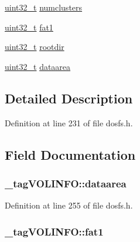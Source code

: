 \begin{DoxyCompactItemize}
\hyperlink{stdint_8h_a435d1572bf3f880d55459d9805097f62}{uint32\-\_\-t} \hyperlink{struct__tag_v_o_l_i_n_f_o_ae43f79217850e7e7d2c58b982ccd70c8}{numclusters}
\item 
\hyperlink{stdint_8h_a435d1572bf3f880d55459d9805097f62}{uint32\-\_\-t} \hyperlink{struct__tag_v_o_l_i_n_f_o_af9ff7c38631aaaa87c0f65832450ca92}{fat1}
\item 
\hyperlink{stdint_8h_a435d1572bf3f880d55459d9805097f62}{uint32\-\_\-t} \hyperlink{struct__tag_v_o_l_i_n_f_o_aa405d5cc36175170ff8b5c771e7f2433}{rootdir}
\item 
\hyperlink{stdint_8h_a435d1572bf3f880d55459d9805097f62}{uint32\-\_\-t} \hyperlink{struct__tag_v_o_l_i_n_f_o_a869ef5cf4455b0c78c9a4d4f5f54f930}{dataarea}
\end{DoxyCompactItemize}


\subsection{Detailed Description}


Definition at line 231 of file dosfs.\-h.



\subsection{Field Documentation}
\hypertarget{struct__tag_v_o_l_i_n_f_o_a869ef5cf4455b0c78c9a4d4f5f54f930}{
\subsubsection[{dataarea}]{ \-\_\-tag\-V\-O\-L\-I\-N\-F\-O\-::dataarea}}\label{struct__tag_v_o_l_i_n_f_o_a869ef5cf4455b0c78c9a4d4f5f54f930}


Definition at line 255 of file dosfs.\-h.

\hypertarget{struct__tag_v_o_l_i_n_f_o_af9ff7c38631aaaa87c0f65832450ca92}{
\subsubsection[{fat1}]{ \-\_\-tag\-V\-O\-L\-I\-N\-F\-O\-::fat1}}\label{struct__tag_v_o_l_i_n_f_o_af9ff7c38631aaaa87c0f65832450ca92}


